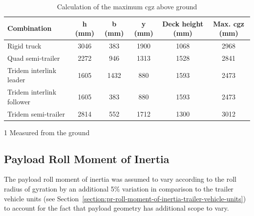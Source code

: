 \begin{table}[H]
	\centering\footnotesize
	\begin{threeparttable}

		\begin{tabulary}{\textwidth}{lccccC}
			\toprule
			\textbf{Combination} & \textbf{h (mm)} & \textbf{b (mm)} & \textbf{y (mm)} & \textbf{Deck height (mm)} & \textbf{Max. \gls{cgz} (mm)} \\

			\midrule
            Rigid truck & 3046  & 383   & 1900  & 1068  & 2968 \\
			Quad semi-trailer & 2272  & 946   & 1313  & 1528  & 2841 \\
			Tridem interlink leader & 1605  & 1432  & 880   & 1593  & 2473 \\
			Tridem interlink follower & 1605  & 383   & 880   & 1593  & 2473 \\
			Tridem semi-trailer & 2814  & 552   & 1712  & 1300  & 3012 \\
			\bottomrule
		\end{tabulary}

		\caption{Calculation of the maximum \gls{cgz} above ground}
		\label{table:payload-estimate-of-maximum-cgz-above-ground}

		\begin{tablenotes}
			\item[1] Measured from the ground
		\end{tablenotes}

	\end{threeparttable}
\end{table}

\subsection{Payload Roll Moment of Inertia}\label{section:pr-roll-radius-of-gyration-payload}

The payload roll moment of inertia was assumed to vary according to the roll radius of gyration by an additional 5\% variation in comparison to the trailer vehicle units (see Section~\ref{section:pr-roll-moment-of-inertia-trailer-vehicle-units})  to account for the fact that payload geometry has additional scope to vary.

